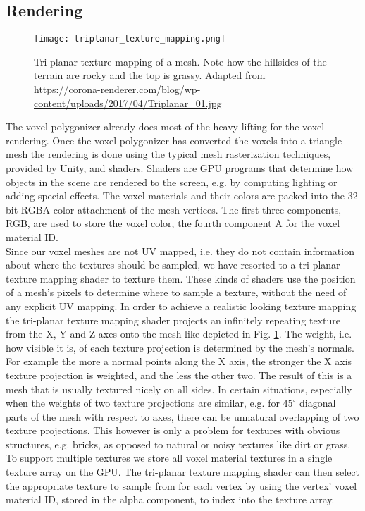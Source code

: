 \subsection{Rendering}
\label{sec:voxel_rendering}

\begin{figure}
\centering
\captionsetup{width=0.8\textwidth}
\texttt{[image: triplanar\_texture\_mapping.png]}
\caption{Tri-planar texture mapping of a mesh. Note how the hillsides of the terrain are rocky and the top is grassy.
Adapted from \url{https://corona-renderer.com/blog/wp-content/uploads/2017/04/Triplanar_01.jpg}}
\label{fig:triplanar_texture_mapping}
\end{figure}

The voxel polygonizer already does most of the heavy lifting for the voxel rendering. Once the voxel polygonizer has converted the voxels into a triangle mesh the rendering is done using the typical mesh rasterization techniques, provided by Unity, and shaders. Shaders are GPU programs that determine how objects in the scene are rendered to the screen, e.g. by computing lighting or adding special effects. The voxel materials and their colors are packed into the 32 bit RGBA color attachment of the mesh vertices. The first three components, RGB, are used to store the voxel color, the fourth component A for the voxel material ID.\\
Since our voxel meshes are not UV mapped, i.e. they do not contain information about where the textures should be sampled, we have resorted to a tri-planar texture mapping shader to texture them. These kinds of shaders use the position of a mesh's pixels to determine where to sample a texture, without the need of any explicit UV mapping. In order to achieve a realistic looking texture
mapping the tri-planar texture mapping shader projects an infinitely repeating texture from the X, Y and Z axes onto the mesh
like depicted in Fig. \ref{fig:triplanar_texture_mapping}. The weight, i.e. how visible it is, of each texture projection is determined by the mesh's normals. For example the more a normal points along the X axis, the stronger the X axis texture projection is weighted, and the less the other two. The result of this is a mesh
that is usually textured nicely on all sides. In certain situations, especially when the weights of two texture projections are similar, e.g. for $45^{\circ}$ diagonal parts of the mesh with respect to axes, there can be unnatural overlapping of two texture projections. This however is only a problem for textures with obvious structures, e.g. bricks, as opposed to natural or noisy textures like dirt or grass. To support multiple textures we store all voxel material textures in a single texture array on the GPU. The tri-planar texture mapping shader can then select the appropriate texture to sample from for each vertex by using the vertex' voxel material ID, stored in the alpha component, to index into the texture array.

